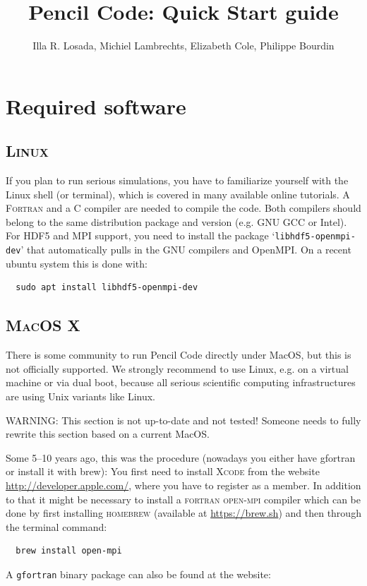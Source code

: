 \documentclass[a4paper,12pt]{article}
\title{Pencil Code: Quick Start guide}
\author{Illa R. Losada, Michiel Lambrechts, Elizabeth Cole, Philippe Bourdin}
\newcommand{\command}[1]{\texttt{#1}}
\newcommand{\directory}[1]{`\texttt{#1}'}
\newcommand{\name}[1]{\textsc{#1}}
\begin{document}
\maketitle

\tableofcontents

\newpage

\section{Required software}

\subsection{\name{Linux}}
If you plan to run serious simulations, you have to familiarize yourself with the Linux shell (or terminal), which is covered in many available online tutorials.
A \name{Fortran} and a \name{C} compiler are needed to compile the code.
Both compilers should belong to the same distribution package and version (e.g. GNU GCC or Intel).
For HDF5 and MPI support, you need to install the package \directory{libhdf5-openmpi-dev} that automatically pulls in the GNU compilers and OpenMPI. On a recent ubuntu system this is done with:
\begin{verbatim}
  sudo apt install libhdf5-openmpi-dev
\end{verbatim}

\subsection{\name{MacOS X}}
There is some community to run Pencil Code directly under MacOS, but this is not officially supported. We strongly recommend to use Linux, e.g. on a virtual machine or via dual boot, because all serious scientific computing infrastructures are using Unix variants like Linux.

WARNING: This section is not up-to-date and not tested! Someone needs to fully rewrite this section based on a current MacOS.

Some 5--10 years ago, this was the procedure (nowadays you either have gfortran or install it with brew):
You first need to install \name{Xcode} from the
website \url{http://developer.apple.com/}, where you have to register as a member.
In addition to that it might be necessary to install a \name{fortran} \name{open-mpi} compiler which can be done by first installing \name{homebrew} (available at \url{https://brew.sh}) and then through the terminal command:
\begin{verbatim}
  brew install open-mpi
\end{verbatim}
A \command{gfortran} binary package can also be found at the website:
\end{document}
